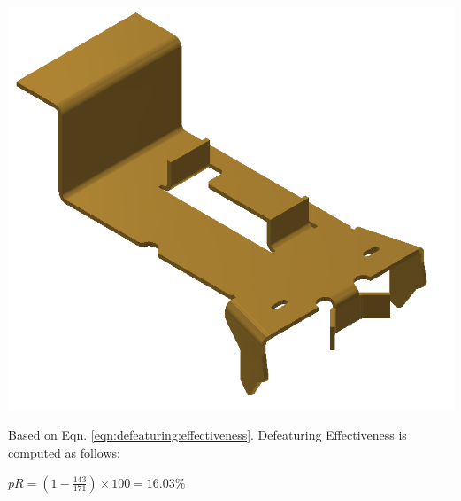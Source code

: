 \begin{minipage}{\linewidth}
\begin{minipage}[c]{0.62\linewidth}
\includegraphics[width=\linewidth,valign=t]{../Common/images/CommercialBracket_Defeatured_model}
 \label{fig:results:CommercialBracket_Defeatured_model}


Based on Eqn. \ref{eqn:defeaturing:effectiveness}. Defeaturing Effectiveness is computed as follows:

$pR = (1 - \frac{143}{171}) \times 100 = 16.03\%$


\end{minipage}
\end{minipage}
